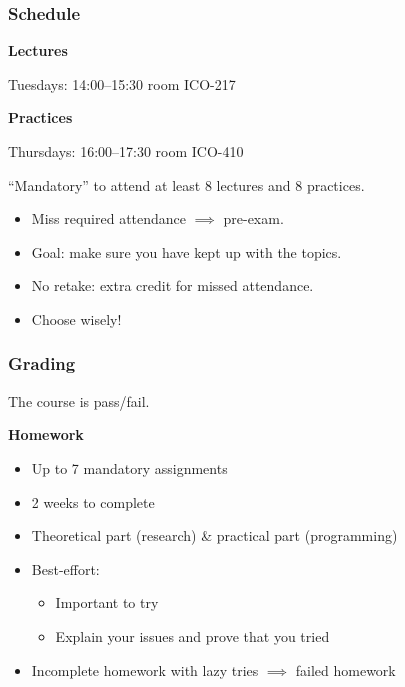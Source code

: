 \begin{frame}
  \frametitle{Schedule}

  \textbf{Lectures}

  Tuesdays: 14:00--15:30 room ICO-217

  \vspace*{1em}

  \pause
  \textbf{Practices}

  Thursdays: 16:00--17:30 room ICO-410

  \vspace*{1em}

  \pause
  \enquote{Mandatory} to attend at least 8 lectures and 8 practices.
  \begin{itemize}[<+(1)->]
    \item Miss required attendance $\implies$ pre-exam.
    \item Goal: make sure you have kept up with the topics.
    \item No retake: extra credit for missed attendance.
    \item Choose wisely!
  \end{itemize}
\end{frame}

\begin{frame}
  \frametitle{Grading}

  The course is pass/fail.

  \vspace*{1em}

  \pause
  \textbf{Homework}
  \begin{itemize}[<+->]
    \item Up to 7 mandatory assignments
    \item 2 weeks to complete
    \item Theoretical part (research) \& practical part (programming)
    \item Best-effort:
    \begin{itemize}
      \item Important to try
      \item Explain your issues and prove that you tried
    \end{itemize}
    \item Incomplete homework with lazy tries $\implies$ failed homework
  \end{itemize}
\end{frame}

